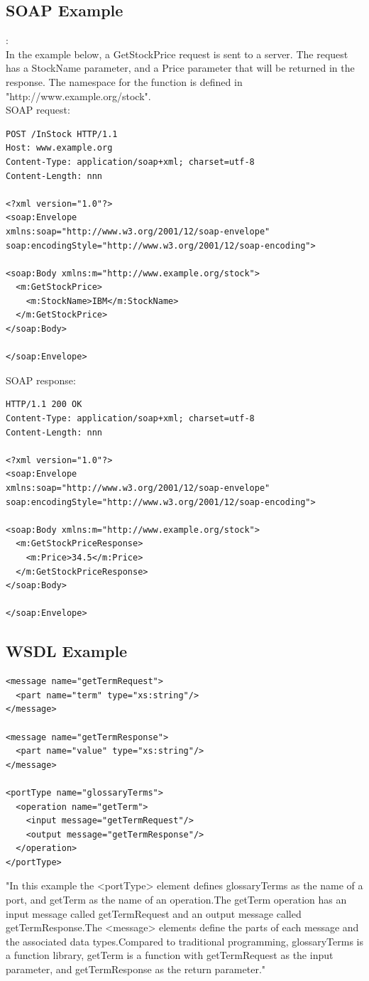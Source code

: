 \documentclass[12pt]{article}
\begin{document}
\subsection{SOAP Example}:
\label{sec:soapelexaple}
\\ In the example below, a GetStockPrice request is sent to a server. The request has a StockName parameter, and a Price parameter that will be returned in the response. The namespace for the function is defined in "http://www.example.org/stock".\\
SOAP request:
\begin{lstlisting}
POST /InStock HTTP/1.1
Host: www.example.org
Content-Type: application/soap+xml; charset=utf-8
Content-Length: nnn

<?xml version="1.0"?>
<soap:Envelope
xmlns:soap="http://www.w3.org/2001/12/soap-envelope"
soap:encodingStyle="http://www.w3.org/2001/12/soap-encoding">

<soap:Body xmlns:m="http://www.example.org/stock">
  <m:GetStockPrice>
    <m:StockName>IBM</m:StockName>
  </m:GetStockPrice>
</soap:Body>

</soap:Envelope>
\end{lstlisting}
SOAP response:
\begin{lstlisting}
HTTP/1.1 200 OK
Content-Type: application/soap+xml; charset=utf-8
Content-Length: nnn

<?xml version="1.0"?>
<soap:Envelope
xmlns:soap="http://www.w3.org/2001/12/soap-envelope"
soap:encodingStyle="http://www.w3.org/2001/12/soap-encoding">

<soap:Body xmlns:m="http://www.example.org/stock">
  <m:GetStockPriceResponse>
    <m:Price>34.5</m:Price>
  </m:GetStockPriceResponse>
</soap:Body>

</soap:Envelope>
\end{lstlisting}

\subsection{WSDL Example}
\label{sec:wsdlexaple}
\begin{lstlisting}
<message name="getTermRequest">
  <part name="term" type="xs:string"/>
</message>

<message name="getTermResponse">
  <part name="value" type="xs:string"/>
</message>

<portType name="glossaryTerms">
  <operation name="getTerm">
    <input message="getTermRequest"/>
    <output message="getTermResponse"/>
  </operation>
</portType>
\end{lstlisting}
"In this example the <portType> element defines glossaryTerms as the name of a port, and getTerm as the name of an operation.The getTerm operation has an input message called getTermRequest and an output message called getTermResponse.The <message> elements define the parts of each message and the associated data types.Compared to traditional programming, glossaryTerms is a function library, getTerm is a function with getTermRequest as the input parameter, and getTermResponse as the return parameter."\cite{wsdl}
\end{document}
